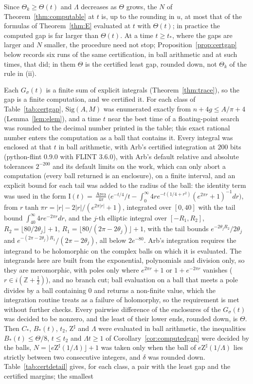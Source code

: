 \documentclass[pdflatex,sn-mathphys-num]{sn-jnl}
\theoremstyle{thmstyleone}%
\theoremstyle{thmstylethree}%
\newcommand{\Sig}{\mathrm{Sig}}
\newcommand{\Area}{\operatorname{Area}}
\newcommand{\Z}{\mathbb{Z}}
\newcommand{\cZ}{\mathrm{Z}}
\begin{document}
Since $\Theta_k\ge\Theta(t)$ and $\Lambda$ decreases as $\Theta$ grows, the $N$ of Theorem~\ref{thm:computable} at $t$ is, up to the rounding in $u$, at most that of the formulas of Theorem~\ref{thm:E} evaluated at $t$ with $\Theta(t)$; in practice the computed gap is far larger than $\Theta(t)$. At a time $t\ge t_*$, where the gaps are larger and $N$ smaller, the procedure need not stop; Proposition~\ref{prop:certgap} below records six runs of the same certification, in ball arithmetic and at such times, that did; in them $\Theta$ is the certified least gap, rounded down, not $\Theta_k$ of the rule in (ii).

Each $G_\sigma(t)$ is a finite sum of explicit integrals (Theorem~\ref{thm:trace}), so the gap is a finite computation, and we certified it. For each class of Table~\ref{tab:certgap}, $\Sig(A,M)$ was enumerated exactly from $n+4g\le A/\pi+4$ (Lemma~\ref{lem:elem}), and a time $t$ near the best time of a floating-point search was rounded to the decimal number printed in the table; this exact rational number enters the computation as a ball that contains it. Every integral was enclosed at that $t$ in ball arithmetic, with Arb's certified integration \cite{arb2017,arbintegration2018} at $200$ bits (python-flint 0.9.0 with FLINT 3.6.0), with Arb's default relative and absolute tolerances $2^{-200}$ and its default limits on the work, which can only abort a computation (every ball returned is an enclosure), on a finite interval, and an explicit bound for each tail was added to the radius of the ball: the identity term was used in the form $\mathrm I(t)=\frac{\Area}{4\pi}\big(e^{-t/4}/t-\int_0^\infty4re^{-t(1/4+r^2)}(e^{2\pi r}+1)^{-1}dr\big)$, from $r\tanh\pi r=|r|-2|r|/(e^{2\pi|r|}+1)$, integrated over $[0,40]$ with the tail bound $\int_{40}^\infty4re^{-2\pi r}dr$, and the $j$-th elliptic integral over $[-R_1,R_2]$, $R_2=\lfloor80/2\theta_j\rfloor+1$, $R_1=\lfloor80/(2\pi-2\theta_j)\rfloor+1$, with the tail bounds $e^{-2\theta_jR_2}/2\theta_j$ and $e^{-(2\pi-2\theta_j)R_1}/(2\pi-2\theta_j)$, all below $2e^{-80}$. Arb's integration requires the integrand to be holomorphic on the complex balls on which it is evaluated. The integrands here are built from the exponential, polynomials and division only, so they are meromorphic, with poles only where $e^{2\pi r}+1$ or $1+e^{-2\pi r}$ vanishes ($r\in i(\Z+\frac12)$), and no branch cut; ball evaluation on a ball that meets a pole divides by a ball containing $0$ and returns a non-finite value, which the integration routine treats as a failure of holomorphy, so the requirement is met without further checks. Every pairwise difference of the enclosures of the $G_\sigma(t)$ was decided to be nonzero, and the least of their lower ends, rounded down, is $\Theta$. Then $C_*$, $B_*(t)$, $t_2$, $\cZ^\sharp$ and $\Lambda$ were evaluated in ball arithmetic, the inequalities $B_*(t)\le\Theta/8$, $t\le t_2$ and $\Lambda t\ge1$ of Corollary~\ref{cor:computedgap} were decided by the balls, $N=\lfloor e\cZ^\sharp(1/\Lambda)\rfloor+1$ was taken only when the ball of $e\cZ^\sharp(1/\Lambda)$ lies strictly between two consecutive integers, and $\delta$ was rounded down. Table~\ref{tab:certdetail} gives, for each class, a pair with the least gap and the certified margins; the smallest 
\end{document}
